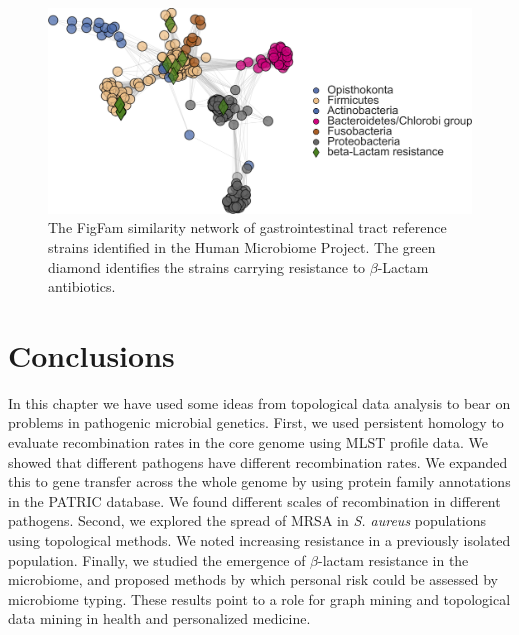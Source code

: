\begin{figure}[t]
\centering
\includegraphics[width=\textwidth]{./fig/pathogens/microbiome_network.png}
\caption[FigFam similarity network of the gastrointestinal tract]{The FigFam similarity network of gastrointestinal tract reference strains identified in the Human Microbiome Project. The green diamond identifies the strains carrying resistance to $\beta$-Lactam antibiotics.}
\label{fig:microbiome_network}
\end{figure}

\section{Conclusions}

In this chapter we have used some ideas from topological data analysis to bear on problems in pathogenic microbial genetics.
First, we used persistent homology to evaluate recombination rates in the core genome using MLST profile data.
We showed that different pathogens have different recombination rates.
We expanded this to gene transfer across the whole genome by using protein family annotations in the PATRIC database.
We found different scales of recombination in different pathogens.
Second, we explored the spread of MRSA in \emph{S. aureus} populations using topological methods.
We noted increasing resistance in a previously isolated population.
Finally, we studied the emergence of $\beta$-lactam resistance in the microbiome, and proposed methods by which personal risk could be assessed by microbiome typing.
These results point to a role for graph mining and topological data mining in health and personalized medicine.